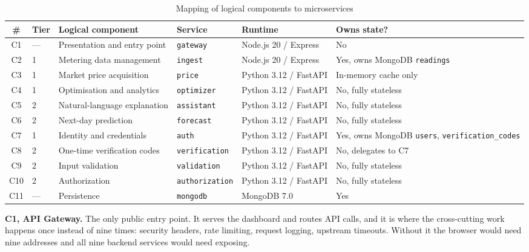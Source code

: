 \documentclass[conference]{IEEEtran}
\begin{document}
\begin{table}[t]
\caption{Mapping of logical components to microservices}
\label{tab:mapping}
\centering
\begin{tabular}{@{}clL{3.1cm}L{2.6cm}L{2.3cm}L{3.4cm}@{}}
\toprule
\textbf{\#} & \textbf{Tier} & \textbf{Logical component} & \textbf{Service} &
\textbf{Runtime} & \textbf{Owns state?} \\
\midrule
C1 & --- & Presentation and entry point & \texttt{gateway} & Node.js 20 / Express & No \\
C2 & 1 & Metering data management     & \texttt{ingest}    & Node.js 20 / Express & Yes, owns MongoDB \texttt{readings} \\
C3 & 1 & Market price acquisition     & \texttt{price}     & Python 3.12 / FastAPI & In-memory cache only \\
C4 & 1 & Optimisation and analytics   & \texttt{optimizer} & Python 3.12 / FastAPI & No, fully stateless \\
C5 & 2 & Natural-language explanation & \texttt{assistant} & Python 3.12 / FastAPI & No, fully stateless \\
C6 & 2 & Next-day prediction          & \texttt{forecast}  & Python 3.12 / FastAPI & No, fully stateless \\
C7 & 1 & Identity and credentials     & \texttt{auth}      & Python 3.12 / FastAPI & Yes, owns MongoDB \texttt{users}, \texttt{verification\_codes} \\
C8 & 2 & One-time verification codes  & \texttt{verification} & Python 3.12 / FastAPI & No, delegates to C7 \\
C9 & 2 & Input validation             & \texttt{validation}   & Python 3.12 / FastAPI & No, fully stateless \\
C10 & 2 & Authorization               & \texttt{authorization} & Python 3.12 / FastAPI & No, fully stateless \\
C11 & --- & Persistence                & \texttt{mongodb}   & MongoDB 7.0 & Yes \\
\bottomrule
\end{tabular}
\end{table}

\textbf{C1, API Gateway.} The only public entry point. It serves the dashboard
and routes API calls, and it is where the cross-cutting work happens once
instead of nine times: security headers, rate limiting, request logging, upstream
timeouts. Without it the browser would need nine addresses and all nine backend
services would need exposing.
\end{document}
